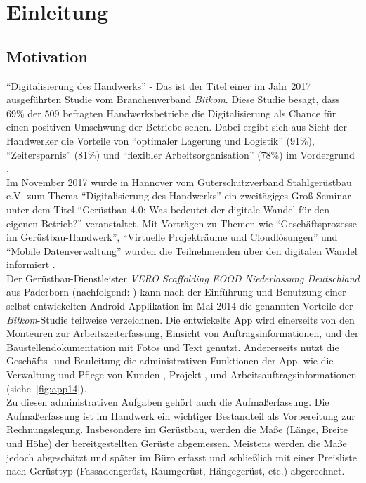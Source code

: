 \chapter{Einleitung}
\section{Motivation}\label{subsec:motivation}
``Digitalisierung des Handwerks'' - Das ist der Titel einer im Jahr 2017 ausgeführten Studie vom Branchenverband \textit{Bitkom}. 
Diese Studie besagt, dass 69\% der 509 befragten Handwerksbetriebe die Digitalisierung als Chance für einen positiven Umschwung der Betriebe sehen. 
Dabei ergibt sich aus Sicht der Handwerker die Vorteile von ``optimaler Lagerung und Logistik'' (91\%), ``Zeitersparnis'' (81\%) und ``flexibler Arbeitsorganisation'' (78\%) im Vordergrund \citep{Bitkom17}. \\

Im November 2017 wurde in Hannover vom Güterschutzverband Stahlgerüstbau e.V. zum Thema ``Digitalisierung des Handwerks'' ein zweitägiges Groß-Seminar unter dem Titel ``Gerüstbau 4.0: Was bedeutet der digitale Wandel für den eigenen Betrieb?'' veranstaltet. 
Mit Vorträgen zu Themen wie ``Geschäftsprozesse im Gerüstbau-Handwerk'', ``Virtuelle Projekträume und Cloudlösungen'' und ``Mobile Datenverwaltung'' wurden die Teilnehmenden über den digitalen Wandel informiert \citep{GSV17}. \\

Der Gerüstbau-Dienstleister \emph{VERO Scaffolding EOOD Niederlassung Deutschland} aus Paderborn (nachfolgend: \vr{}) kann nach der Einführung und Benutzung einer selbst entwickelten Android-Applikation im Mai 2014 die genannten Vorteile der \textit{Bitkom}-Studie teilweise verzeichnen.
Die entwickelte App wird einerseits von den Monteuren zur Arbeitszeiterfassung, Einsicht von Auftragsinformationen, und der Baustellendokumentation mit Fotos und Text genutzt.
Andererseits nutzt die Geschäfts- und Bauleitung die administrativen Funktionen der App, wie die Verwaltung und Pflege von Kunden-, Projekt-, und Arbeitsauftragsinformationen (siehe~\autoref{fig:app14}). \\

Zu diesen administrativen Aufgaben gehört auch die Aufmaßerfassung.
Die Aufmaßerfassung ist im Handwerk ein wichtiger Bestandteil als Vorbereitung zur Rechnungslegung.
Insbesondere im Gerüstbau, werden die Maße (Länge, Breite und Höhe) der bereitgestellten Gerüste abgemessen.
Meistens werden die Maße jedoch abgeschätzt und später im Büro erfasst und schließlich mit einer Preisliste nach Gerüsttyp (Fassadengerüst, Raumgerüst, Hängegerüst, etc.) abgerechnet.


